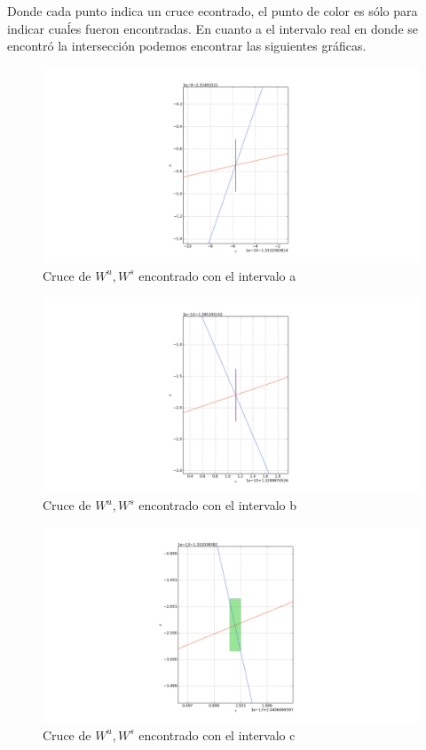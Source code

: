 Donde cada punto indica un cruce econtrado, el punto de color es sólo para indicar cuaĺes fueron encontradas. En cuanto a el intervalo real en donde se encontró la intersección podemos encontrar las siguientes gráficas.


\begin{figure}[H]
\centering
\includegraphics[scale=0.4]{cruce1}
\caption{Cruce de $W^{u},W^{s}$ encontrado con el intervalo a}
\label{cruce1}
\end{figure}

\begin{figure}[H]
\centering
\includegraphics[scale=0.4]{cruce2}
\caption{Cruce de $W^{u},W^{s}$ encontrado con el intervalo b}
\label{cruce2}
\end{figure}


\begin{figure}[H]
\centering
\includegraphics[scale=0.4]{cruce3}
\caption{Cruce de $W^{u},W^{s}$ encontrado con el intervalo c }
\label{cruce3}
\end{figure}


